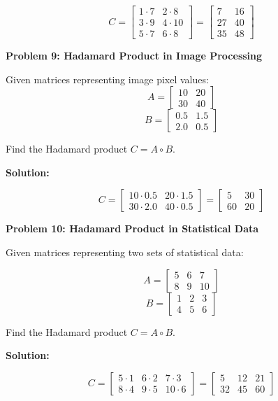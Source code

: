 \documentclass[
  letterpaper,
  DIV=11,
  numbers=noendperiod]{scrreprt}
\theoremstyle{plain}
\theoremstyle{definition}
\theoremstyle{remark}
\begin{document}
\[C=\begin{bmatrix}1\cdot 7&2\cdot 8\\3\cdot 9&4\cdot 10\\5\cdot 7&6\cdot 8\end{bmatrix}=\begin{bmatrix}7&16\\27&40\\35&48\end{bmatrix}\]

\textbf{Problem 9: Hadamard Product in Image Processing}

Given matrices representing image pixel values:
\[A=\begin{bmatrix}10&20\\30&40\end{bmatrix}\]
\[B=\begin{bmatrix}0.5&1.5\\2.0&0.5\end{bmatrix}\]

Find the Hadamard product \(C=A\circ B\).

\textbf{Solution:}

\[C=\begin{bmatrix}10\cdot 0.5&20\cdot 1.5\\30\cdot 2.0&40\cdot 0.5\end{bmatrix}=\begin{bmatrix}5&30\\60&20\end{bmatrix}\]

\textbf{Problem 10: Hadamard Product in Statistical Data}

Given matrices representing two sets of statistical data:

\[A=\begin{bmatrix}5&6&7\\8&9&10\end{bmatrix}\]
\[B=\begin{bmatrix}1&2&3\\4&5&6\end{bmatrix}\]

Find the Hadamard product \(C=A\circ B\).

\textbf{Solution:}

\[C=\begin{bmatrix}5\cdot 1&6\cdot 2&7\cdot 3\\8\cdot 4&9\cdot 5&10\cdot 6\end{bmatrix}=\begin{bmatrix}5&12&21\\32&45&60\end{bmatrix}\]
\end{document}
